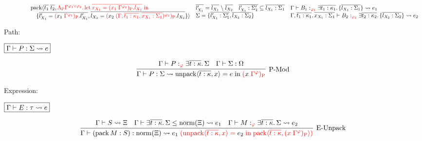 \begin{gather*}
{\begin{array}{l}
      \hspace{4em}\sympack\langle \overline{t_1}\; \overline{t_2}, \textcolor{red}{\Lambda_\symP \Gamma^{\varphi_1 \lor \varphi_2}\ldotp \symlet \overline{x_{X_1} = (x_1\; \Gamma^{\varphi_1})_\symP.l_{X_1}} \symin} \\
      \hspace{5em}\{\overline{l'_{X_1} = \textcolor{red}{(} x_1\; \textcolor{red}{\Gamma^{\varphi_1})_\symP}.l'_{X_1}}, \overline{l_{X_2} = \textcolor{red}{(} x_2\; \textcolor{red}{(\Gamma, \overline{t_1: \kappa_1}, \overline{x_{X_1}: \Sigma_1})^{\varphi_2})_\symP}.l_{X_2}}\}\rangle
    \end{array}
  }{
    \begin{array}{lll}
      \overline{l'_{X_1}} = \overline{l_{X_1}} \rcomplement \overline{l_{X_2}}
      &
      \overline{l'_{X_1}: \Sigma'_1} \subseteq \overline{l_{X_1}: \Sigma_1}
      &
      \Gamma \vdash B_1:_{\textcolor{red}{\varphi_1}} \exists \overline{t_1: \kappa_1}\ldotp \{\overline{l_{X_1}: \Sigma_1}\} \elaborate e_1
      \\
      \multicolumn{2}{l}{\Sigma = \{\overline{l'_{X_1}: \Sigma'_1}, \overline{l_{X_2}: \Sigma_2}\}}
      &
      \Gamma, \overline{t_1: \kappa_1}, \overline{x_{X_1}: \Sigma_1} \vdash B_2:_{\textcolor{red}{\varphi_2}} \exists \overline{t_2: \kappa_2}\ldotp \{\overline{l_{X_2}: \Sigma_2}\} \elaborate e_2
    \end{array}
  }
\end{gather*}

Path:

$\fbox{$\Gamma \vdash P: \Sigma \rightsquigarrow e$}$

\begin{gather*}
  \infer[\text{P-Mod}]{\Gamma \vdash P: \Sigma \elaborate \symunpack\langle \overline{t: \kappa}, x\rangle = e \symin \textcolor{red}{(}x\; \textcolor{red}{\Gamma^\varphi)_\symP}}{
    \Gamma \vdash P:_{\textcolor{red}{\varphi}} \exists \overline{t: \kappa}\ldotp \Sigma
    &
    \Gamma \vdash \Sigma: \Omega
  }
\end{gather*}

Expression:

$\fbox{$\Gamma \vdash E: \tau \rightsquigarrow e$}$

\begin{gather*}
  \infer[\text{E-Unpack}]{\Gamma \vdash (\sympack M: S): \symnorm(\Xi) \elaborate e_1\; \textcolor{red}{(\symunpack\langle \overline{t: \kappa}, x\rangle =}\; e_2 \;\textcolor{red}{\symin \sympack\langle \overline{t: \kappa}, (x\; \Gamma^\varphi)_\symP\rangle)}}{
    \Gamma \vdash S \elaborate \Xi
    &
    \Gamma \vdash \exists \overline{t: \kappa}\ldotp \Sigma \leq \symnorm(\Xi) \elaborate e_1
    &
    \Gamma \vdash M:_{\textcolor{red}{\varphi}} \exists \overline{t: \kappa}\ldotp \Sigma \elaborate e_2
  }
\end{gather*}
